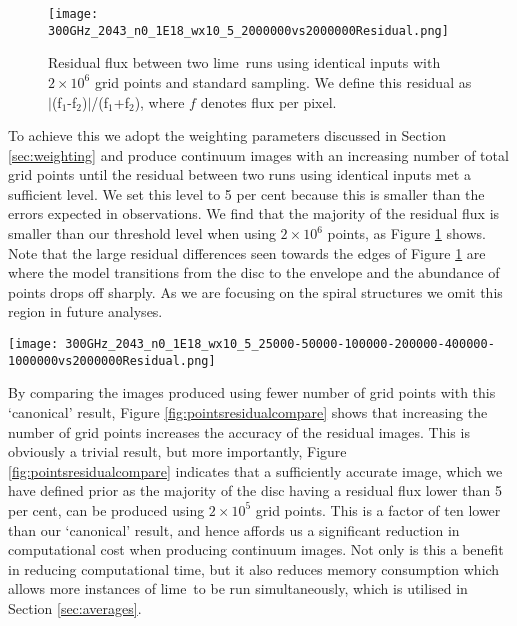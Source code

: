 \documentclass[fleqn,usenatbib]{mnras}
\newcommand{\lime}{{\sc lime}}
\begin{document}
\begin{figure}
    \texttt{[image: 300GHz\_2043\_n0\_1E18\_wx10\_5\_2000000vs2000000Residual.png]}
    \caption{Residual flux between two \lime\ runs using identical inputs with $2 \times 10^6$ grid points and standard sampling. We define this residual as $|$(f$_1$-f$_2$)$|$/(f$_1$+f$_2$), where $f$ denotes flux per pixel.}
    \label{fig:residual2000000}
\end{figure}

To achieve this we adopt the weighting parameters discussed in Section \ref{sec:weighting} and produce continuum images with an increasing number of total grid points until the residual between two runs using identical inputs met a sufficient level. We set this level to 5 per cent because this is smaller than the errors expected in observations. We find that the majority of the residual flux is smaller than our threshold level when using $2 \times 10^6$ points, as Figure \ref{fig:residual2000000} shows. Note that the large residual differences seen towards the edges of Figure \ref{fig:residual2000000} are where the model transitions from the disc to the envelope and the abundance of points drops off sharply. As we are focusing on the spiral structures we omit this region in future analyses.

\begin{figure*}
    \texttt{[image: 300GHz\_2043\_n0\_1E18\_wx10\_5\_25000-50000-100000-200000-400000-1000000vs2000000Residual.png]}
    \caption{Residual flux between standard \lime\ runs using the indicated number of grid points and $2 \times 10^6$ grid points, with standard sampling. We define this residual as $|$(f$_1$-f$_2$)$|$/(f$_1$+f$_2$), where $f$ denotes flux per pixel.}
    \label{fig:pointsresidualcompare}
\end{figure*}

By comparing the images produced using fewer number of grid points with this `canonical' result, Figure \ref{fig:pointsresidualcompare} shows that increasing the number of grid points increases the accuracy of the residual images. This is obviously a trivial result, but more importantly, Figure \ref{fig:pointsresidualcompare} indicates that a sufficiently accurate image, which we have defined prior as the majority of the disc having a residual flux lower than 5 per cent, can be produced using $2 \times 10^5$ grid points. This is a factor of ten lower than our `canonical' result, and hence affords us a significant reduction in computational cost when producing continuum images. Not only is this a benefit in reducing computational time, but it also reduces memory consumption which allows more instances of \lime\ to be run simultaneously, which is utilised in Section \ref{sec:averages}.
\end{document}
